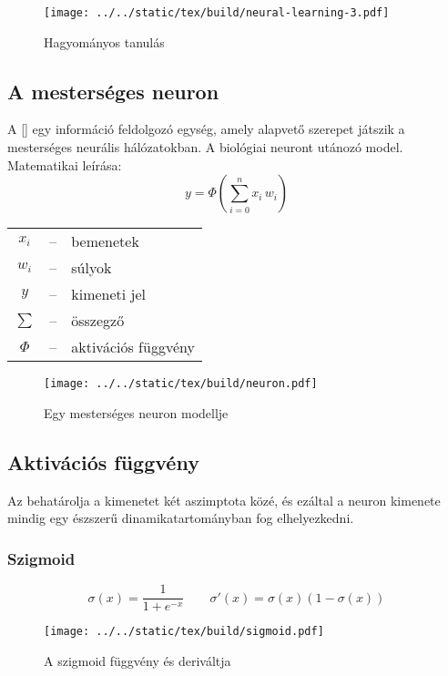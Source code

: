 \documentclass[../../main.tex]{subfiles}
\begin{document}
\begin{figure}[H]
  \centering
  \texttt{[image: ../../static/tex/build/neural-learning-3.pdf]}
  \caption{Hagyományos tanulás}
  \label{fig:learning3}
\end{figure}

\subsection{A mesterséges neuron}

A [] egy információ feldolgozó egység, amely alapvető
szerepet játszik a mesterséges neurális hálózatokban. A biológiai neuront
utánozó model. Matematikai leírása:
\[
  y = \varPhi \left( \sum_{i=0}^n x_i \, w_i \right)
\]
\begin{center}
  \begin{tabular}{c c l}
    $x_i$     & -- & bemenetek           \\
    $w_i$     & -- & súlyok              \\
    $y$       & -- & kimeneti jel        \\
    $\sum$    & -- & összegző            \\
    $\varPhi$ & -- & aktivációs függvény
  \end{tabular}
\end{center}
\begin{figure}[H]
  \centering
  \texttt{[image: ../../static/tex/build/neuron.pdf]}
  \caption{Egy mesterséges neuron modellje}
  \label{fig:neuron}
\end{figure}

\subsection{Aktivációs függvény}

Az  behatárolja a kimenetet két aszimptota közé,
és ezáltal a neuron kimenete mindig egy észszerű dinamikatartományban fog
elhelyezkedni.

\subsubsection{Szigmoid}
\[
  \sigma(x) = \frac{1}{1 + e^{-x}}
  \qquad
  \sigma'(x) = \sigma(x) \left( 1 - \sigma(x) \right)
\]
\begin{figure}[H]
  \centering
  \texttt{[image: ../../static/tex/build/sigmoid.pdf]}
  \caption{A szigmoid függvény és deriváltja}
  \label{fig:sigmoid}
\end{figure}
\end{document}
